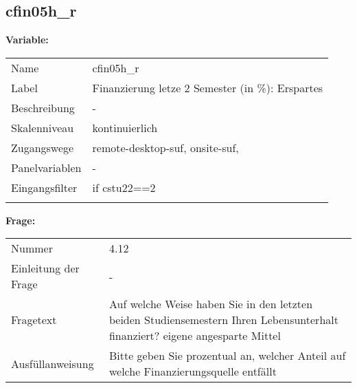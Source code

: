 	
	
	\subsection{cfin05h\_r}
	\label{subSection:cfin05h_r}

	\noindent\textbf{Variable:}\\
		\begin{tabular}{lL{11.3cm}}
			\label{tableVariable:cfin05h_r}
			Name & cfin05h\_r \\
			Label & Finanzierung letze 2 Semester (in \%): Erspartes \\
			Beschreibung & - \\
			Skalenniveau & kontinuierlich \\
			Zugangswege &
				remote-desktop-suf,
				onsite-suf,
 \\
			Panelvariablen & -
			 \\
			Eingangsfilter & if cstu22==2 \\
 \\
		\end{tabular}

		\vspace*{1 cm}
		\noindent\textbf{Frage:}\\
		\begin{tabular}{lL{11.3cm}}
			\label{tableQuestion:cfin05h_r}
			Nummer & 4.12 \\
			Einleitung der Frage & - \\
			Fragetext & Auf welche Weise haben Sie in den letzten beiden Studiensemestern Ihren Lebensunterhalt finanziert?
eigene angesparte Mittel \\
			Ausfüllanweisung & Bitte geben Sie prozentual an, welcher Anteil auf welche Finanzierungsquelle entfällt \\
		\end{tabular}




